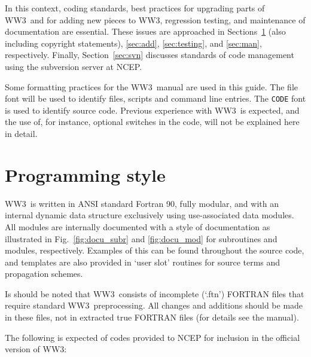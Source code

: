 \documentclass[12pt]{article}
\newcommand{\ws}{WW3}
\newcommand{\file}{\sf}
\newcommand{\code}{\tt}
\newcommand{\pb}{\strut \vfill \pagebreak}
\newcommand{\newsec}{\setcounter{equation}{0}
                      \setcounter{myfigno}{0}
                      \setcounter{mytabno}{0}}
\newcounter{myfigno}[section]
\newcounter{mytabno}[section]
\begin{document}
In this context, coding standards, best practices for upgrading parts of \ws\
and for adding new pieces to \ws, regression testing, and maintenance of
documentation are essential. These issues are approached in
Sections~\ref{sec:style} (also including copyright statements), \ref{sec:add},
\ref{sec:testing}, and \ref{sec:man}, respectively.  Finally,
Section~\ref{sec:svn} discusses standards of code management using the
subversion server at NCEP.

Some formatting practices for the \ws\ manual are used in this guide. The
{\file file} font will be used to identify files, scripts and command line
entries. The {\code CODE} font is used to identify source code. Previous
experience with \ws\ is expected, and the use of, for instance, optional
switches in the code, will not be explained here in detail.


\pb
\section{Programming style} \label{sec:style}
\newsec

\ws\ is written in ANSI standard Fortran 90, fully modular, and with an
internal dynamic data structure exclusively using use-associated data modules.
All modules are internally documented with a style of documentation as
illustrated in Fig.~\ref{fig:docu_subr} and \ref{fig:docu_mod} for subroutines
and modules, respectively. Examples of this can be found throughout the source
code, and templates are also provided in `user slot' routines for source terms
and propagation schemes. 

Is should be noted that \ws\ consists of incomplete (`{\file .ftn}') FORTRAN
files that require standard \ws\ preprocessing. All changes and additions
should be made in these files, not in extracted true FORTRAN files (for
details see the manual).

The following is expected of codes provided to NCEP for inclusion in the
official version of \ws :
\end{document}
